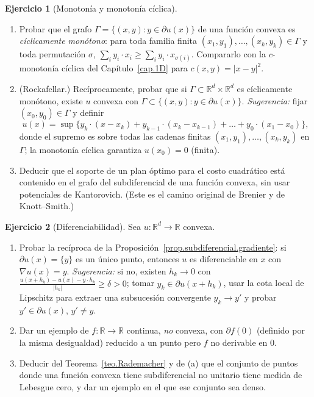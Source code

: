 \documentclass[12pt, a4paper]{amsbook}
\newcommand{\R}{{\mathbb R}}
\theoremstyle{remark}
\theoremstyle{definition}
\newtheorem{ejercicio}{Ejercicio}[chapter]
\numberwithin{section}{chapter}
\numberwithin{subsection}{section}
\numberwithin{equation}{section}
\numberwithin{figure}{chapter}
\begin{document}
\begin{ejercicio}[Monotonía y monotonía cíclica]\label{ejer.subdif.monotono}
\leavevmode
\begin{enumerate}[label=(\alph*)]
\item Probar que el grafo $\Gamma=\{(x,y):y\in\partial u(x)\}$ de una función
convexa es \emph{cíclicamente monótono}: para toda familia finita
$(x_1,y_1),\dots,(x_k,y_k)\in\Gamma$ y toda permutación $\sigma$,
$\sum_iy_i\cdot x_i\ge\sum_iy_i\cdot x_{\sigma(i)}$. Compararlo con la
$c$-monotonía cíclica del Capítulo~\ref{cap.1D} para $c(x,y)=|x-y|^2$.
\item (Rockafellar.) Recíprocamente, probar que si $\Gamma\subset\R^d\times\R^d$
es cíclicamente monótono, existe $u$ convexa con $\Gamma\subset\{(x,y):y\in\partial u(x)\}$.
\emph{Sugerencia:} fijar $(x_0,y_0)\in\Gamma$ y definir
\[
u(x)=\sup\bigl\{y_k\cdot(x-x_k)+y_{k-1}\cdot(x_k-x_{k-1})+\dots+y_0\cdot(x_1-x_0)\bigr\},
\]
donde el supremo es sobre todas las cadenas finitas $(x_1,y_1),\dots,(x_k,y_k)$
en $\Gamma$; la monotonía cíclica garantiza $u(x_0)=0$ (finita).
\item Deducir que el soporte de un plan óptimo para el costo cuadrático está
contenido en el grafo del subdiferencial de una función convexa, sin usar
potenciales de Kantorovich. (Este es el camino original de Brenier y de
Knott--Smith.)
\end{enumerate}
\end{ejercicio}

\begin{ejercicio}[Diferenciabilidad]\label{ejer.subdif.diferenciabilidad}
Sea $u\colon\R^d\to\R$ convexa.
\begin{enumerate}[label=(\alph*)]
\item Probar la recíproca de la Proposición~\ref{prop.subdiferencial.gradiente}:
si $\partial u(x)=\{y\}$ es un único punto, entonces $u$ es diferenciable en
$x$ con $\nabla u(x)=y$. \emph{Sugerencia:} si no, existen $h_k\to0$ con
$\frac{u(x+h_k)-u(x)-y\cdot h_k}{|h_k|}\ge\delta>0$; tomar
$y_k\in\partial u(x+h_k)$, usar la cota local de Lipschitz para extraer
una subsucesión convergente $y_k\to y'$ y probar $y'\in\partial u(x)$,
$y'\ne y$.
\item Dar un ejemplo de $f\colon\R\to\R$ continua, \emph{no} convexa, con
$\partial f(0)$ (definido por la misma desigualdad) reducido a un punto pero
$f$ no derivable en $0$.
\item Deducir del Teorema~\ref{teo.Rademacher} y de (a) que el conjunto de
puntos donde una función convexa tiene subdiferencial no unitario tiene
medida de Lebesgue cero, y dar un ejemplo en el que ese conjunto sea denso.
\end{enumerate}
\end{ejercicio}
\end{document}
